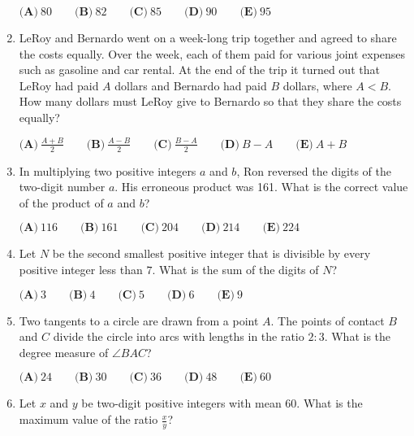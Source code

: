 \documentclass{article}
\begin{document}
\begin{enumerate}[label=\arabic*., itemsep=0.5em]
\(\textbf{(A)}\ 80 \qquad \textbf{(B)}\ 82 \qquad \textbf{(C)}\ 85 \qquad \textbf{(D)}\ 90 \qquad \textbf{(E)}\ 95\)\par \vspace{0.5em}\item LeRoy and Bernardo went on a week-long trip together and agreed to share the costs equally.  Over the week, each of them paid for various joint expenses such as gasoline and car rental.  At the end of the trip it turned out that LeRoy had paid \(A\) dollars and Bernardo had paid \(B\) dollars, where \(A<B\).  How many dollars must LeRoy give to Bernardo so that they share the costs equally?

\(\textbf{(A)}\ \frac{A+B}{2} \qquad \textbf{(B)}\ \frac{A-B}{2} \qquad \textbf{(C)}\ \frac{B-A}{2} \qquad \textbf{(D)}\ B-A \qquad \textbf{(E)}\ A+B\)\par \vspace{0.5em}\item In multiplying two positive integers \(a\) and \(b\), Ron reversed the digits of the two-digit number \(a\).  His erroneous product was 161.  What is the correct value of the product of \(a\) and \(b\)?

\(\textbf{(A)}\ 116 \qquad \textbf{(B)}\ 161 \qquad \textbf{(C)}\ 204 \qquad \textbf{(D)}\ 214 \qquad \textbf{(E)}\ 224\)\par \vspace{0.5em}\item Let \(N\) be the second smallest positive integer that is divisible by every positive integer less than \(7\).  What is the sum of the digits of \(N\)?

\(\textbf{(A)}\ 3 \qquad \textbf{(B)}\ 4 \qquad \textbf{(C)}\ 5 \qquad \textbf{(D)}\ 6 \qquad \textbf{(E)}\ 9\)\par \vspace{0.5em}\item Two tangents to a circle are drawn from a point \(A\).  The points of contact \(B\) and \(C\) divide the circle into arcs with lengths in the ratio \(2 : 3\).  What is the degree measure of \(\angle{BAC}\)?

\(\textbf{(A)}\ 24 \qquad \textbf{(B)}\ 30 \qquad \textbf{(C)}\ 36 \qquad \textbf{(D)}\ 48 \qquad \textbf{(E)}\ 60\)\par \vspace{0.5em}\item Let \(x\) and \(y\) be two-digit positive integers with mean \(60\).  What is the maximum value of the ratio \(\frac{x}{y}\)?


\end{enumerate}
\end{document}
